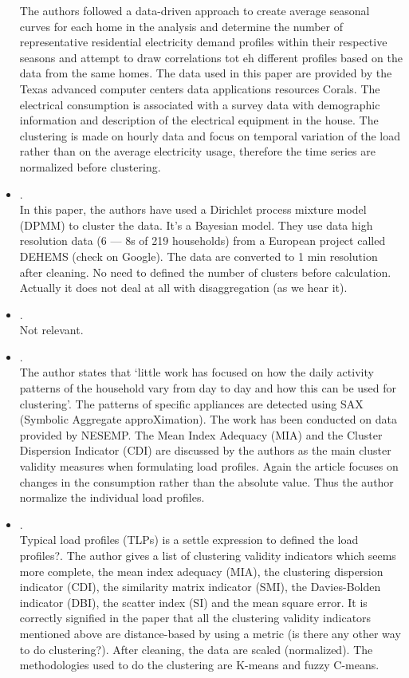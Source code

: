 \begin{itemize}
	 The authors followed a data-driven approach to create average seasonal curves for each home in the analysis and determine the number of representative residential electricity demand profiles within their respective seasons and attempt to draw correlations tot eh different profiles based on the data from the same homes. The data used in this paper are provided by the Texas advanced computer centers data applications resources Corals. The electrical consumption is associated with a survey data with demographic information and description of the electrical equipment in the house. The clustering is made on hourly data and focus on temporal variation of the load rather than on the average electricity usage, therefore the time series are normalized before clustering.
	\item {}.\\
	 In this paper, the authors have used a Dirichlet process mixture model (DPMM) to cluster the data. It's a Bayesian model. They use data high resolution data (6 --- 8s of 219 households) from a European project called DEHEMS (check on Google). The data are converted to 1 min resolution after cleaning. No need to defined the number of clusters before calculation. Actually it does not deal at all with disaggregation (as we hear it).
	\item {}.\\
	 Not relevant.
	\item {}.\\
	 The author states that `little work has focused on how the daily activity patterns of the household vary from day to day and how this can be used for clustering'. The patterns of specific appliances are detected using SAX (Symbolic Aggregate approXimation). The work has been conducted on data provided by NESEMP. The Mean Index Adequacy (MIA) and the Cluster Dispersion Indicator (CDI) are discussed by the authors as the main cluster validity measures when formulating load profiles. Again the article focuses on changes in the consumption rather than the absolute value. Thus the author normalize the individual load profiles.
	\item {}.\\
	 Typical load profiles (TLPs) is a settle expression to defined the load profiles?. The author gives a list of clustering validity indicators which seems more complete, the mean index adequacy (MIA), the clustering dispersion indicator (CDI), the similarity matrix indicator (SMI), the Davies-Bolden indicator (DBI), the scatter index (SI) and the mean square error. It is correctly signified in the paper that all the clustering validity indicators mentioned above are distance-based by using a metric (is there any other way to do clustering?). After cleaning, the data are scaled (normalized). The methodologies used to do the clustering are K-means and fuzzy C-means.

\end{itemize}
